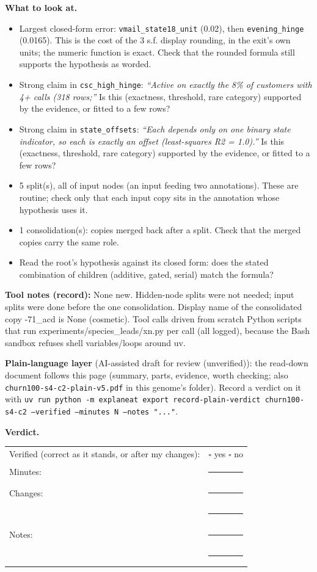 \documentclass[a4paper,11pt]{article}
\begin{document}
\textbf{What to look at.}
\begin{itemize}
\item Largest closed-form error: \texttt{vmail\_\allowbreak{}state18\_\allowbreak{}unit} (0.02), then \texttt{evening\_\allowbreak{}hinge} (0.0165). This is the cost of the 3 s.f. display rounding, in the exit's own units; the numeric function is exact. Check that the rounded formula still supports the hypothesis as worded.
\item Strong claim in \texttt{csc\_\allowbreak{}high\_\allowbreak{}hinge}: \emph{``Active on exactly the 8\% of customers with 4+ calls (318 rows;''} Is this (exactness, threshold, rare category) supported by the evidence, or fitted to a few rows?
\item Strong claim in \texttt{state\_\allowbreak{}offsets}: \emph{``Each depends only on one binary state indicator, so each is exactly an offset (least-squares R2 = 1.0).''} Is this (exactness, threshold, rare category) supported by the evidence, or fitted to a few rows?
\item 5 split(s), all of input nodes (an input feeding two annotations). These are routine; check only that each input copy sits in the annotation whose hypothesis uses it.
\item 1 consolidation(s): copies merged back after a split. Check that the merged copies carry the same role.
\item Read the root's hypothesis against its closed form: does the stated combination of children (additive, gated, serial) match the formula?
\end{itemize}
\textbf{Tool notes (record):} None new. Hidden-node splits were not needed; input splits were done before the one consolidation. Display name of the consolidated copy -71\_\allowbreak{}acd is None (cosmetic). Tool calls driven from scratch Python scripts that run experiments/\allowbreak{}species\_\allowbreak{}leads/\allowbreak{}xn.py per call (all logged), because the Bash sandbox refuses shell variables/loops around uv.

\textbf{Plain-language layer} (AI-assisted draft for review (unverified)): the read-down document follows this page (summary, parts, evidence, worth checking; also \texttt{churn100-s4-c2-plain-v5.pdf} in this genome's folder). Record a verdict on it with \texttt{uv run python -m explaneat export record-plain-verdict churn100-s4-c2 --verified --minutes N --notes "..."}.

\textbf{Verdict.}

\begin{tabularx}{\linewidth}{@{}lX@{}}
Verified (correct as it stands, or after my changes): & $\square$ yes \quad $\square$ no \\[4pt]
Minutes: & \rule{3cm}{0.4pt} \\[4pt]
Changes: & \rule{\linewidth}{0.4pt} \\[10pt]
 & \rule{\linewidth}{0.4pt} \\[4pt]
Notes: & \rule{\linewidth}{0.4pt} \\[10pt]
 & \rule{\linewidth}{0.4pt} \\
\end{tabularx}
\end{document}
